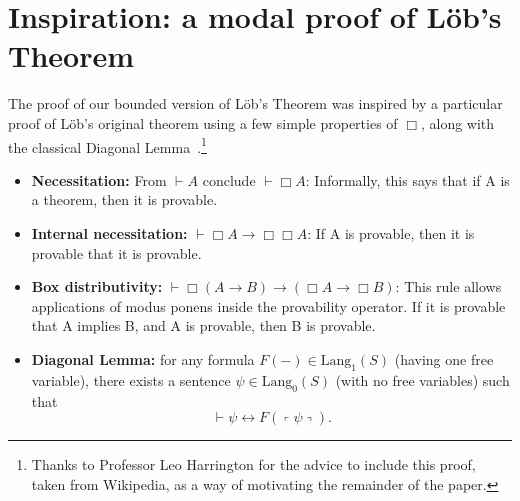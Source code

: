 \documentclass[onecolumn]{miri-tech-article}
\numberwithin{equation}{section}
\theoremstyle{definition}
\newcommand{\proves}[1]{\underset{#1}{\vdash}}
\newcommand{\Lang}{\mathrm{Lang}}
\renewcommand{\iff}{\leftrightarrow}
\newcommand{\qquote}[1]{\left\ulcorner #1 \right\urcorner}
\renewcommand{\-}{^{-1}}
\begin{document}
\section{Inspiration: a modal proof of L\"{o}b's Theorem}

The proof of our bounded version of L\"{o}b's Theorem was inspired by a particular proof of L\"{o}b's original theorem using a few simple properties of $\Box$, along with the classical Diagonal Lemma~\cite{Carnap:1934}.\footnote{Thanks to Professor Leo Harrington for the advice to include this proof, taken from Wikipedia, as a way of motivating the remainder of the paper.}

\begin{itemize}
\item {\bf Necessitation:} From $\vdash A$ conclude $\vdash \Box A$: Informally, this says that if A is a theorem, then it is provable.
\item {\bf Internal necessitation:} $\vdash \Box A \rightarrow \Box \Box A$: If A is provable, then it is provable that it is provable.
\item {\bf Box distributivity:} $\vdash \Box (A \rightarrow B) \rightarrow (\Box A \rightarrow \Box B)$:  This rule allows applications of modus ponens inside the provability operator. If it is provable that A implies B, and A is provable, then B is provable.
\item {\bf Diagonal Lemma:} for any formula $F(-)\in\Lang_1(S)$ (having one free variable), there exists a sentence $\psi\in\Lang_0(S)$ (with no free variables) such that $$\proves{} \psi \iff F(\qquote\psi).$$  
\end{itemize}
\end{document}
